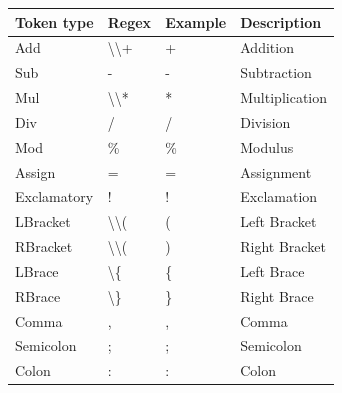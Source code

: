\documentclass{report}
\newcommand{\+}{}
\begin{document}
    \begin{table}[hb!]
        \centering
        \begin{tabular}{l|lll}
            \hline
            Token type   & Regex                                                  & Example           & Description    \\ \hline
            Add          & \textbackslash{}\textbackslash{}+                      & +                 & Addition       \\
            Sub          & -                                                      & -                 & Subtraction    \\
            Mul          & \textbackslash{}\textbackslash{}*                      & *                 & Multiplication \\
            Div          & /                                                      & /                 & Division       \\
            Mod          & \%                                                     & \%                & Modulus        \\
            Assign       & =                                                      & =                 & Assignment     \\
            Exclamatory  & !                                                      & !                 & Exclamation    \\
            LBracket     & \textbackslash{}\textbackslash{}(                      & (                 & Left Bracket   \\
            RBracket     & \textbackslash{}\textbackslash{}(                      & )                 & Right Bracket  \\
            LBrace       & \textbackslash{}\{                                     & \{                & Left Brace     \\
            RBrace       & \textbackslash{}\}                                     & \}                & Right Brace    \\
            Comma        & ,                                                      & ,                 & Comma          \\
            Semicolon    & ;                                                      & ;                 & Semicolon      \\
            Colon        & :                                                      & :                 & Colon          \\

\end{tabular}
\end{table}
\end{document}
